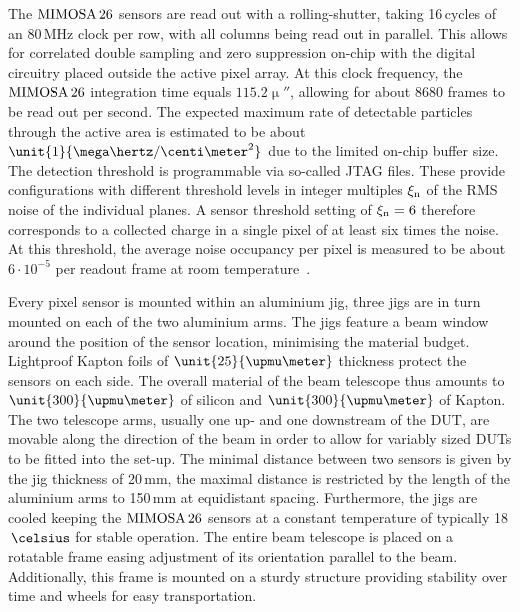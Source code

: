 The $\textrm{MIMOSA\,26}$ sensors are read out with a rolling-shutter, taking 16\,cycles of an 80\,MHz clock per row, with all columns being read out in parallel. 
This allows for correlated double sampling and zero suppression on-chip with the digital circuitry placed outside the active pixel array. 
At this clock frequency, the $\textrm{MIMOSA\,26}$ integration time equals $\unit{115.2}{\upmu\second}$, allowing for about 8680 frames to be read out per second. 
The expected maximum rate of detectable particles through the active area is estimated to be about $\unit{1}{\mega\hertz/\centi\meter^2}$ due to the limited on-chip buffer size. 
The detection threshold is programmable via so-called JTAG files. 
These provide configurations with different threshold levels in integer multiples $\xi_{\textrm{n}}$ of the RMS noise of the individual planes. 
A sensor threshold setting of $\xi_{\textrm{n}} = 6$ therefore corresponds to a collected charge in a single pixel of at least six times the noise. 
At this threshold, the average noise occupancy per pixel is measured to be about $6\cdot10^{-5}$ per readout frame at room temperature~\cite{ref:mimosa26}.

Every pixel sensor is mounted within an aluminium jig, three jigs are in turn mounted on each of the two aluminium arms. 
The jigs feature a beam window around the position of the sensor location, minimising the material budget. 
Lightproof Kapton foils of $\unit{25}{\upmu\meter}$ thickness protect the sensors on each side.
The overall material of the beam telescope thus amounts to $\unit{300}{\upmu\meter}$ of silicon and $\unit{300}{\upmu\meter}$ of Kapton. 
The two telescope arms, usually one up- and one downstream of the DUT, are movable along the direction of the beam in order to allow for variably sized DUTs to be fitted into the set-up. 
The minimal distance between two sensors is given by the jig thickness of 20\,mm, the maximal distance is restricted by the length of the aluminium arms to 150\,mm at equidistant spacing.
Furthermore, the jigs are cooled keeping the $\textrm{MIMOSA\,26}$ sensors at a constant temperature of typically 18$\,\celsius$ for stable operation.
The entire beam telescope is placed on a rotatable frame easing adjustment of its orientation parallel to the beam. 
Additionally, this frame is mounted on a sturdy structure providing stability over time and wheels for easy transportation. 

